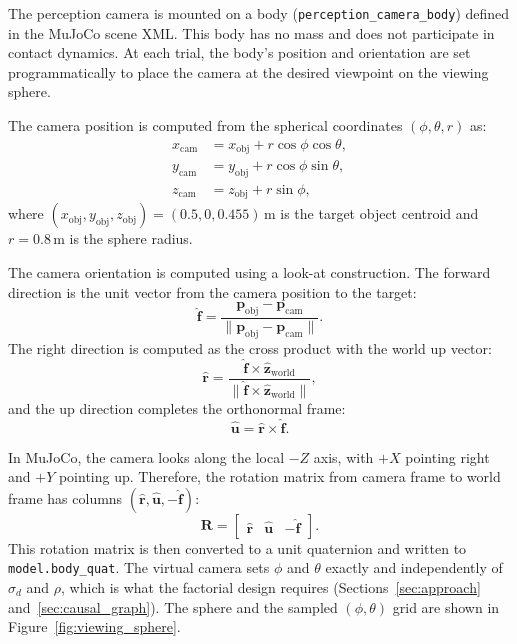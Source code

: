 \documentclass[11pt,a4paper]{report}
\begin{document}
The perception camera is mounted on a body (\texttt{perception\_camera\_body}) defined in the MuJoCo scene XML. This body has no mass and does not participate in contact dynamics. At each trial, the body's position and orientation are set programmatically to place the camera at the desired viewpoint on the viewing sphere.

The camera position is computed from the spherical coordinates $(\phi, \theta, r)$ as:
\begin{align}
  x_{\text{cam}} &= x_{\text{obj}} + r \cos\phi \cos\theta, \nonumber \\
  y_{\text{cam}} &= y_{\text{obj}} + r \cos\phi \sin\theta, \label{eq:cam_pos} \\
  z_{\text{cam}} &= z_{\text{obj}} + r \sin\phi, \nonumber
\end{align}
where $(x_{\text{obj}}, y_{\text{obj}}, z_{\text{obj}}) = (0.5, 0, 0.455)$\,m is the target object centroid and $r = 0.8$\,m is the sphere radius.

The camera orientation is computed using a look-at construction. The forward direction is the unit vector from the camera position to the target:
\begin{equation}
  \hat{\mathbf{f}} = \frac{\mathbf{p}_{\text{obj}} - \mathbf{p}_{\text{cam}}}
                         {\|\mathbf{p}_{\text{obj}} - \mathbf{p}_{\text{cam}}\|}.
  \label{eq:forward}
\end{equation}
The right direction is computed as the cross product with the world up vector:
\begin{equation}
  \hat{\mathbf{r}} = \frac{\hat{\mathbf{f}} \times \hat{\mathbf{z}}_{\text{world}}}
                         {\|\hat{\mathbf{f}} \times \hat{\mathbf{z}}_{\text{world}}\|},
  \label{eq:right}
\end{equation}
and the up direction completes the orthonormal frame:
\begin{equation}
  \hat{\mathbf{u}} = \hat{\mathbf{r}} \times \hat{\mathbf{f}}.
  \label{eq:up}
\end{equation}

In MuJoCo, the camera looks along the local $-Z$ axis, with $+X$ pointing right and $+Y$ pointing up. Therefore, the rotation matrix from camera frame to world frame has columns $(\hat{\mathbf{r}}, \hat{\mathbf{u}}, -\hat{\mathbf{f}})$:
\begin{equation}
  \mathbf{R} = \begin{bmatrix} \hat{\mathbf{r}} & \hat{\mathbf{u}} & -\hat{\mathbf{f}} \end{bmatrix}.
  \label{eq:cam_rot}
\end{equation}
This rotation matrix is then converted to a unit quaternion and written to \texttt{model.body\_quat}. The virtual camera sets $\phi$ and $\theta$ exactly and independently of $\sigma_d$ and $\rho$, which is what the factorial design requires (Sections~\ref{sec:approach} and~\ref{sec:causal_graph}). The sphere and the sampled $(\phi,\theta)$ grid are shown in Figure~\ref{fig:viewing_sphere}.
\end{document}
